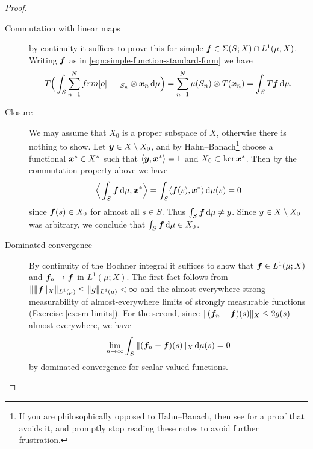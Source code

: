 \begin{proof}
  \begin{description}
 
    \item[Commutation with linear maps] by continuity it suffices to prove this for simple $\bm{f} \in \Sigma(S;X) \cap L^1(\mu;X)$.
    Writing $\bm{f}$ as in \eqref{eqn:simple-function-standard-form} we have 
    \begin{equation*}
        T\Big(\int_S \sum_{n=1}^N \1_{S_n} \otimes \mb{x}_n \, \dd\mu \Big)
        = \sum_{n=1}^N \mu(S_n) \otimes T(\mb{x}_n) 
        = \int_S T\mb{f} \, \dd\mu.
    \end{equation*}
        
  \item[Closure] We may assume that $X_0$ is a proper subspace of $X$, otherwise there is nothing to show.
    Let $\bm{y} \in X \setminus X_0$, and by Hahn--Banach\footnote{If you are philosophically opposed to Hahn--Banach, then see \cite[Corollary 1.1.22]{HNVW16} for a proof that avoids it, and promptly stop reading these notes to avoid further frustration.} choose a functional $\bm{x}^* \in X^*$ such that $\langle \bm{y}, \bm{x}^* \rangle = 1$ and $X_0 \subset \ker \bm{x}^*$.
    Then by the commutation property above we have
    \begin{equation*}
      \Big\langle \int_S \bm{f} \, \mathrm{d}\mu, \bm{x}^* \Big\rangle = \int_S \langle \bm{f}(s), \bm{x}^* \rangle \, \mathrm{d}\mu(s) = 0
    \end{equation*}
    since $\bm{f}(s) \in X_0$ for almost all $s \in S$.
    Thus $\int_S \bm{f} \, \mathrm{d}\mu \neq y$.
    Since $y \in X \setminus X_0$ was arbitrary, we conclude that $\int_S \bm{f} \, \mathrm{d}\mu \in X_0$.

  \item[Dominated convergence]
    By continuity of the Bochner integral it suffices to show that $\bm{f} \in L^1(\mu;X)$ and $\bm{f}_n \to \bm{f}$ in $L^1(\mu;X)$.
    The first fact follows from $\|\|\bm{f}\|_{X}\|_{L^1(\mu)} \leq \|g\|_{L^1(\mu)} < \infty$ and the almost-everywhere strong measurability of almost-everywhere limits of strongly measurable functions (Exercise \ref{ex:sm-limits}).
    For the second, since $\|(\bm{f}_n - \bm{f})(s)\|_X \leq 2g(s)$ almost everywhere, we have
    \begin{equation*}
      \lim_{n \to \infty} \int_S \|(\bm{f}_n - \bm{f})(s)\|_X \, \mathrm{d}\mu(s) = 0
    \end{equation*}
    by dominated convergence for scalar-valued functions.
    

\end{description}
\end{proof}
